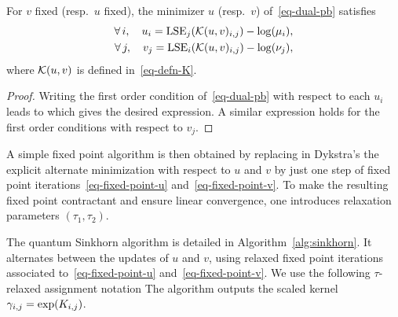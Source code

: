 \begin{prop}\label{prop-fixed-points}
	For $v$ fixed (resp.\ $u$ fixed), the minimizer $u$ (resp.\ $v$) of~\eqref{eq-dual-pb} satisfies
	\begin{align}\label{eq-fixed-point-u}
		\forall \, i, \quad u_i = \operatorname{LSE}_j(\mathcal{K}(u,v)_{i,j})-\log(\mu_i), \\
		\forall \, j, \quad v_j = \operatorname{LSE}_i(\mathcal{K}(u,v)_{i,j})-\log(\nu_j), \label{eq-fixed-point-v}
	\end{align}
	where $\mathcal{K}(u,v)$ is defined in~\eqref{eq-defn-K}.
\end{prop}
\begin{proof}
	Writing the first order condition of~\eqref{eq-dual-pb} with respect to each $u_i$ leads to
	which gives the desired expression. A similar expression holds for the first order conditions with respect to $v_j$.
\end{proof}



A simple fixed point algorithm is then obtained by replacing in Dykstra's the explicit alternate minimization with respect to $u$ and $v$ by just one step of fixed point iterations~\eqref{eq-fixed-point-u} and~\eqref{eq-fixed-point-v}. To make the resulting fixed point contractant and ensure linear convergence, one introduces relaxation parameters $(\tau_1,\tau_2)$. 

The quantum Sinkhorn algorithm is detailed in Algorithm~\ref{alg:sinkhorn}. It alternates between the updates of $u$ and $v$, using relaxed fixed point iterations associated to~\eqref{eq-fixed-point-u} and~\eqref{eq-fixed-point-v}. We use the following $\tau$-relaxed assignment notation 
The algorithm outputs the scaled kernel $\gamma_{i,j} = \exp(K_{i,j})$.



